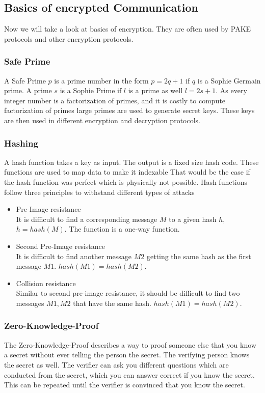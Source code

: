 \documentclass[journal]{IEEEtran}
\begin{document}
\subsection{Basics of encrypted Communication} %

Now we will take a look at basics of encryption. They are often used by PAKE protocols and other encryption protocols.
\subsubsection{Safe Prime}
    A Safe Prime $p$ is a prime number in the form $p = 2q + 1$ if $q$ is a Sophie Germain prime.
    A prime $s$ is a Sophie Prime if $l$ is a prime as well $l= 2s + 1$.
    As every integer number is a factorization of primes, and it is costly to compute factorization of primes large primes are used to generate secret keys.
    These keys are then used in different encryption and decryption protocols. 
\subsubsection{Hashing}
    A hash function takes a key as input.
    The output is a fixed size hash code.
    These functions are used to map data to make it indexable 
    That would be the case if the hash function was perfect which is physically not possible.
    Hash functions follow three principles to withstand different types of attacks \cite{sobti2012cryptographic}
    \begin{itemize}[]
        \item Pre-Image resistance \\
        It is difficult to find a corresponding message $M$ to a given hash $h$, $h=hash(M)$.
        The function is a one-way function.
        \item Second Pre-Image resistance \\
        It is difficult to find another message $M2$ getting the same hash as the first message $M1$. $hash(M1)=hash(M2)$.
        \item Collision resistance \\
        Similar to second pre-image resistance, it should be difficult to find two messages $M1,M2$ that have the same hash. $hash(M1)=hash(M2)$. 
    \end{itemize}
\subsubsection{Zero-Knowledge-Proof}
    The Zero-Knowledge-Proof describes a way to proof someone else that you know a secret without ever telling the person the secret. The verifying person knows the secret as well.
    The verifier can ask you different questions which are conducted from the secret, which you can answer correct if you know the secret.
    This can be repeated until the verifier is convinced that you know the secret.
    
\end{document}
